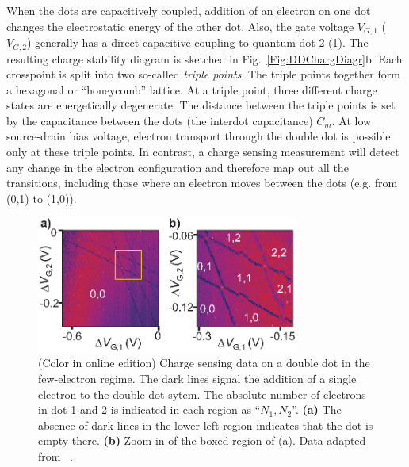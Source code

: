 \documentclass[rmp,twocolumn,aps]{revtex4}
\begin{document}
When the dots are capacitively coupled, addition of an electron on
one dot changes the electrostatic energy of the other dot. Also,
the gate voltage $V_{G,1}$ ($V_{G,2}$) generally has a direct
capacitive coupling to quantum dot 2 (1). The resulting charge
stability diagram is sketched in Fig.~\ref{Fig:DDChargDiagr}b.
Each crosspoint is split into two so-called \textit{triple
points}. The triple points together form a hexagonal or
``honeycomb'' lattice. At a triple point, three different charge
states are energetically degenerate. The distance between the
triple points is set by the capacitance between the dots (the
interdot capacitance) $C_{m}$. At low source-drain bias voltage,
electron transport through the double dot is possible only at
these triple points. In contrast, a charge sensing measurement
will detect any change in the electron configuration and therefore
map out all the transitions, including those where an electron
moves between the dots (e.g. from (0,1) to (1,0)).

\begin{figure}[hbt]
\includegraphics[width=3.4in, clip=true]{hanson_fig28.eps}
\caption{(Color in online edition) Charge sensing data on a double dot in the few-electron
regime. The dark lines signal the addition of a single electron to
the double dot sytem. The absolute number of electrons in dot 1
and 2 is indicated in each region as ``$N_1,N_2$''. \textbf{(a)}
The absence of dark lines in the lower left region indicates that
the dot is empty there. \textbf{(b)} Zoom-in of the boxed region
of (a). Data adapted from ~\textcite{ElzermanPRB2003}.}
\label{fig:DDFewEl}
\end{figure}
\end{document}
